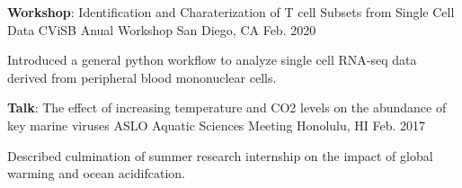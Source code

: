 \begin{cventries}
  \cventry
    {\textbf{Workshop}: Identification and Charaterization of T cell Subsets from Single Cell Data} %
    {CViSB Anual Workshop} %
    {San Diego, CA} %
    {Feb. 2020} %
    {
      \begin{cvitems} %
        \item {Introduced a general python workflow to analyze single cell RNA-seq data derived from peripheral blood mononuclear cells.}
      \end{cvitems}
    }

  \cventry
    {\textbf{Talk}: The effect of increasing temperature and CO2 levels on the abundance of key marine viruses} %
    {ASLO Aquatic Sciences Meeting} %
    {Honolulu, HI} %
    {Feb. 2017} %
    {
      \begin{cvitems} %
        \item {Described culmination of summer research internship on the impact of global warming and ocean acidifcation.}
      \end{cvitems}
    }

\end{cventries}
